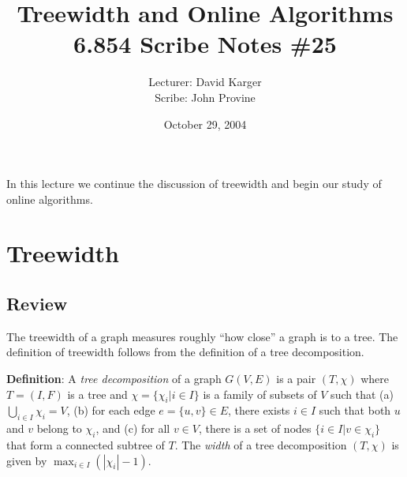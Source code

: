 \documentclass{article}
\title{Treewidth and Online Algorithms\\6.854 Scribe Notes \#25}
\date{October 29, 2004}
\author{Lecturer: David Karger\\ Scribe: John Provine}
\begin{document}
%
%
%
%

%




In this lecture we continue the discussion of treewidth and begin
our study of online algorithms.

\section{Treewidth}

\subsection{Review}

The treewidth of a graph measures roughly ``how close'' a graph is
to a tree. The definition of treewidth follows from the definition
of a tree decomposition.

\textbf{Definition}:
A \emph{tree decomposition} of a graph $G(V,E)$ is a pair
$(T,\chi)$ where $T=(I,F)$ is a tree and $\chi=\{\chi_i|i\in I\}$
is a family of subsets of $V$ such that (a) $\bigcup_{i\in
I}\chi_i=V$, (b) for each edge $e=\{u,v\}\in E$, there exists
$i\in I$ such that both $u$ and $v$ belong to $\chi_i$, and (c)
for all $v\in V$, there is a set of nodes $\{i\in I|v\in\chi_i\}$
that form a connected subtree of $T$. The \emph{width} of a tree
decomposition $(T,\chi)$ is given by $\max_{i\in I}(|\chi_i|-1)$.
\end{document}
